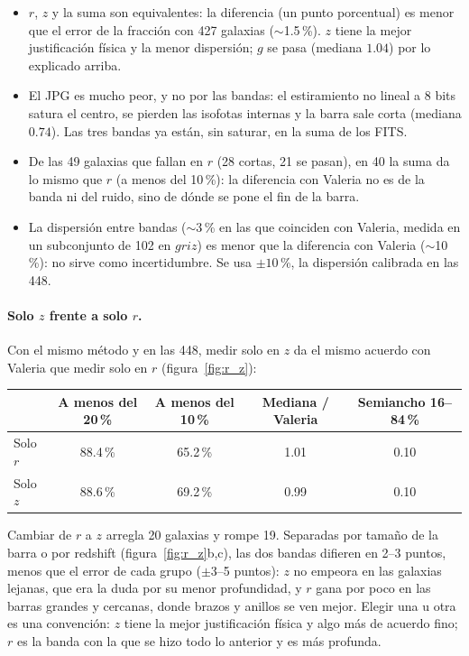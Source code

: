 \documentclass[11pt,a4paper]{article}
\begin{document}
\begin{itemize}
\item $r$, $z$ y la suma son equivalentes: la diferencia (un punto porcentual) es menor que el error de la
fracción con 427 galaxias ($\sim$1.5\,\%). $z$ tiene la mejor justificación física y la menor dispersión; $g$ se
pasa (mediana $1.04$) por lo explicado arriba.
\item El JPG es mucho peor, y no por las bandas: el estiramiento no lineal a 8 bits satura el centro, se pierden
las isofotas internas y la barra sale corta (mediana $0.74$). Las tres bandas ya están, sin saturar, en la suma de
los FITS.
\item De las 49 galaxias que fallan en $r$ (28 cortas, 21 se pasan), en 40 la suma da lo mismo que $r$ (a menos
del 10\,\%): la diferencia con Valeria no es de la banda ni del ruido, sino de dónde se pone el fin de la barra.
\item La dispersión entre bandas ($\sim$3\,\% en las que coinciden con Valeria, medida en un subconjunto de 102 en $griz$) es menor que la diferencia con
Valeria ($\sim$10\,\%): no sirve como incertidumbre. Se usa $\pm10$\,\%, la dispersión calibrada en las 448.
\end{itemize}

\paragraph{Solo $z$ frente a solo $r$.} Con el mismo método y en las 448, medir solo en $z$ da el mismo
acuerdo con Valeria que medir solo en $r$ (figura~\ref{fig:r_z}):
\begin{center}
\begin{tabular}{lcccc}
\toprule
 & A menos del 20\,\% & A menos del 10\,\% & Mediana / Valeria & Semiancho 16--84\,\% \\
\midrule
Solo $r$ & 88.4\,\% & 65.2\,\% & 1.01 & 0.10 \\
Solo $z$ & 88.6\,\% & 69.2\,\% & 0.99 & 0.10 \\
\bottomrule
\end{tabular}
\end{center}
Cambiar de $r$ a $z$ arregla 20 galaxias y rompe 19. Separadas por tamaño de la barra o por redshift
(figura~\ref{fig:r_z}b,c), las dos bandas difieren en 2--3 puntos, menos que el error de cada grupo
($\pm$3--5 puntos): $z$ no empeora en las galaxias lejanas, que era la duda por su menor profundidad, y $r$ gana
por poco en las barras grandes y cercanas, donde brazos y anillos se ven mejor. Elegir una u otra es una
convención: $z$ tiene la mejor justificación física y algo más de acuerdo fino; $r$ es la banda con la que se hizo
todo lo anterior y es más profunda.
\end{document}
